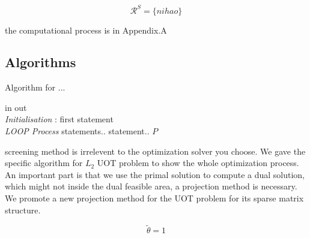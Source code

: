\begin{thm}\label{area}
$$
\mathcal{R}^S = \{ nihao \}
$$
\end{thm}
the computational process is in Appendix.A

\subsection{Algorithms}

 \begin{algorithm}
 \caption{Algorithm for ...}
 \begin{algorithmic}[1]
 \renewcommand{\algorithmicrequire}{\textbf{Input:}}
 \renewcommand{\algorithmicensure}{\textbf{Output:}}
 \REQUIRE in
 \ENSURE  out
 \\ \textit{Initialisation} :
  \STATE first statement
 \\ \textit{LOOP Process}
  \STATE statements..
  \STATE statement..
  \ENDIF
  \ENDFOR
 \RETURN $P$ 
 \end{algorithmic} 
 \end{algorithm}

screening method is irrelevent to the optimization solver you choose. We gave the specific algorithm for $L_2$ UOT problem to show the whole optimization process.\\
An important part is that we use the primal solution to compute a dual solution, which might not inside the dual feasible area, a projection method is necessary. We promote a new projection method for the UOT problem for its sparse matrix structure.

\begin{thm}\label{proj}
$$
\tilde{\theta} = 1
$$
\end{thm}











































